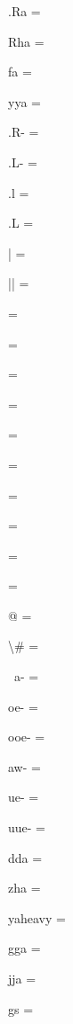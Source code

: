 \documentclass{article}
\begin{document}
\begin{multicols}{6}
\noindent .Ra = {\fdeva {}}\par
\noindent Rha = {\fdeva {}}\par
\noindent fa = {\fdeva {}}\par
\noindent yya = {\fdeva {}}\par
\noindent .R- = {\fdeva {}}\par
\noindent .L- = {\fdeva {}}\par
\noindent .l = {\fdeva {}}\par
\noindent .L = {\fdeva {}}\par
\noindent | = {\fdeva \vh{|}}\par
\noindent || = {\fdeva \vh{||}}\par
{} = {\fdeva {}}\par
{} = {\fdeva {}}\par
{} = {\fdeva {}}\par
{} = {\fdeva {}}\par
{} = {\fdeva {}}\par
{} = {\fdeva {}}\par
{} = {\fdeva {}}\par
{} = {\fdeva {}}\par
{} = {\fdeva {}}\par
{} = {\fdeva {}}\par
\noindent @ = {\fdeva {}}\par
\noindent \textbackslash\# = {\fdeva \vh{\#}}\par
\noindent ~a- = {\fdeva {}}\par
\noindent oe- = {\fdeva {}}\par
\noindent ooe- = {\fdeva {}}\par
\noindent aw- = {\fdeva {}}\par
\noindent ue- = {\fdeva {}}\par
\noindent uue- = {\fdeva {}}\par
\noindent dda = {\fdeva {}}\par
\noindent zha = {\fdeva {}}\par
\noindent yaheavy = {\fdeva {}}\par
\noindent gga = {\fdeva {}}\par
\noindent jja = {\fdeva {}}\par
\noindent gs = {\fdeva {}}\par

\end{multicols}
\end{document}
